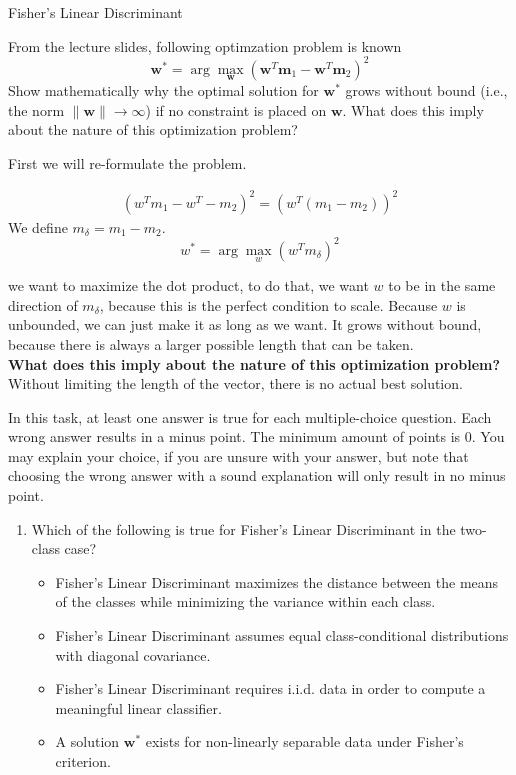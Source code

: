 \documentclass[
	english,
        solution=true
	]{tudaexercise}
\begin{document}
\begin{task}[points=6]{Fisher's Linear Discriminant}
\begin{subtask}[points=3]{}
From the lecture slides, following optimzation problem is known
\[
\mathbf{w}^* = \arg\max_{\mathbf{w}} \left( \mathbf{w}^T \mathbf{m}_1 - \mathbf{w}^T \mathbf{m}_2 \right)^2
\]
Show mathematically why the optimal solution for \( \mathbf{w}^* \) grows without bound (i.e., the norm \( \|\mathbf{w}\| \to \infty \)) if no constraint is placed on \( \mathbf{w} \). What does this imply about the nature of this optimization problem?
\end{subtask}
\begin{solution}


First we will re-formulate the problem.

\begin{align*}
    (w^Tm_1-w^T-m_2)^2 = (w^T(m_1-m_2))^2
\end{align*}
 We define $m_\delta=m_1-m_2$.
 \[w^*=\arg \max_w (w^Tm_\delta)^2\]

we want to maximize the dot product, to do that, we want $w$ to be in the same direction of $m_\delta$, because this is the perfect condition to scale. Because $w$ is unbounded, we can just make it as long as we want. It grows without bound, because there is always a larger possible length that can be taken.\\

\textbf{What does this imply about the nature of this optimization problem?}\\

Without limiting the length of the vector, there is no actual best solution.

\end{solution}

\begin{subtask}[points=3]{}
In this task, at least one answer is true for each multiple-choice question. Each wrong answer results in a minus point. The minimum amount of points is 0. You may explain your choice, if you are unsure with your answer, but note that choosing the wrong answer with a sound explanation will only result in no minus point.

\begin{enumerate}
\item Which of the following is true for Fisher's Linear Discriminant in the two-class case?

\begin{itemize}[label=\Square]
    \item Fisher's Linear Discriminant maximizes the distance between the means of the classes while minimizing the variance within each class.
    \item Fisher's Linear Discriminant assumes equal class-conditional distributions with diagonal covariance.
    \item Fisher's Linear Discriminant requires i.i.d. data in order to compute a meaningful linear classifier.
    \item A solution $\mathbf{w}^*$ exists for non-linearly separable data under Fisher's criterion.
\end{itemize}


\end{enumerate}
\end{subtask}
\end{task}
\end{document}
